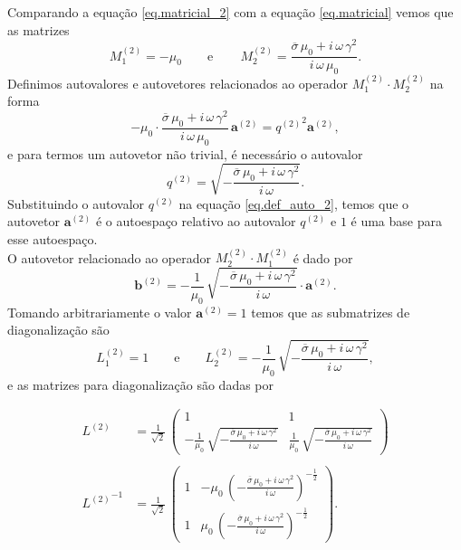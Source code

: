 Comparando a equa\c{c}\~ao \ref{eq.matricial_2} com a equa\c{c}\~ao \ref{eq.matricial} vemos que as matrizes
\begin{equation*}
M^{(2)}_1=-\mu_0\qquad\text{e}\qquad\,M^{(2)}_2=\frac{\overline{\sigma}\,\mu_0+i\,\omega\,\gamma^2}{i\,\omega\,\mu_0}.
\end{equation*}
Definimos autovalores e autovetores relacionados ao operador $M^{(2)}_1\cdot M^{(2)}_2$ na forma
\begin{equation}\label{eq.def_auto_2}
-\mu_0\cdot\frac{\overline{\sigma}\,\mu_0+i\,\omega\,\gamma^2}{i\,\omega\,\mu_0}\,\mathbf{a}^{(2)}={q^{(2)}}^2\mathbf{a}^{(2)},
\end{equation}
e para termos um autovetor n\~ao trivial, \'e necess\'ario o autovalor
\begin{equation*}
q^{(2)}=\sqrt{-\frac{\overline{\sigma}\,\mu_0+i\,\omega\,\gamma^2}{i\,\omega}}.
\end{equation*}
Substituindo o autovalor $q^{(2)}$ na equa\c{c}\~ao \ref{eq.def_auto_2}, temos que o autovetor $\mathbf{a}^{(2)}$ \'e o autoespa\c{c}o relativo ao autovalor $q^{(2)}$ e ${1}$ \'e uma base para esse autoespa\c{c}o.\\
O autovetor relacionado ao operador $M^{(2)}_2\cdot M^{(2)}_1$ \'e dado por
\begin{equation*}
\mathbf{b}^{(2)}=-\frac{1}{\mu_0}\,\sqrt{-\frac{\overline{\sigma}\,\mu_0+i\,\omega\,\gamma^2}{i\,\omega}}\cdot\mathbf{a}^{(2)}.
\end{equation*}
Tomando arbitrariamente o valor $\mathbf{a}^{(2)}=1$ temos que as submatrizes de diagonaliza\c{c}\~ao s\~ao
\begin{equation*}
L^{(2)}_1=1\qquad\text{e}\qquad L^{(2)}_2=-\frac{1}{\mu_0}\,\sqrt{-\frac{\overline{\sigma}\,\mu_0+i\,\omega\,\gamma^2}{i\,\omega}},
\end{equation*}
e as matrizes para diagonaliza\c{c}\~ao s\~ao dadas por
\begin{Large}
\begin{align*}
L^{(2)}&=\frac{1}{\sqrt{2}}\,
\begin{pmatrix}
1&1\\
-\frac{1}{\mu_0}\,\sqrt{-\frac{\overline{\sigma}\,\mu_0+i\,\omega\,\gamma^2}{i\,\omega}}&\frac{1}{\mu_0}\,\sqrt{-\frac{\overline{\sigma}\,\mu_0+i\,\omega\,\gamma^2}{i\,\omega}}
\end{pmatrix}\\\\
{L^{(2)}}^{-1}&=\frac{1}{\sqrt{2}}\,
\begin{pmatrix}
1&-\mu_0\,(-\frac{\overline{\sigma}\,\mu_0+i\,\omega\,\gamma^2}{i\,\omega})^{-\frac{1}{2}}\\
1&\mu_0\,(-\frac{\overline{\sigma}\,\mu_0+i\,\omega\,\gamma^2}{i\,\omega})^{-\frac{1}{2}}
\end{pmatrix}.
\end{align*}
\end{Large}
